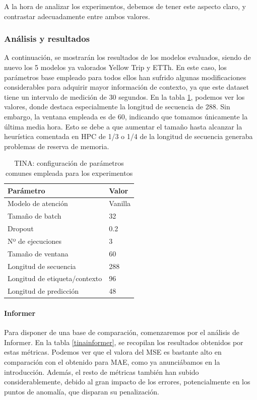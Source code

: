 A la hora de analizar los experimentos, debemos de tener este aspecto claro, y contrastar adecuadamente entre ambos valores.

\subsubsection{Análisis y resultados}

A continuación, se mostrarán los resultados de los modelos evaluados, siendo de nuevo los 5 modelos ya valorados Yellow Trip y ETTh. En este caso, los parámetros base empleado para todos ellos han sufrido algunas modificaciones considerables para adquirir mayor información de contexto, ya que este dataset tiene un intervalo de medición de 30 segundos. En la tabla \ref{ajustestina}, podemos ver los valores, donde destaca especialmente la longitud de secuencia de 288. Sin embargo, la ventana empleada es de 60, indicando que tomamos únicamente la última media hora. Esto se debe a que aumentar el tamaño hasta alcanzar la heurística comentada en HPC de 1/3 o 1/4 de la longitud de secuencia generaba problemas de reserva de memoria.

\begin{table}[!ht]
	\centering
	\begin{tabular}{l|l}
		\toprule
		Parámetro & Valor \\
		\midrule
		{Modelo de atención} & Vanilla \\
		{Tamaño de batch} & 32 \\
		{Dropout} & 0.2 \\
		{Nº de ejecuciones} & 3 \\
		{Tamaño de ventana} & 60 \\
		{Longitud de secuencia} & 288 \\
		{Longitud de etiqueta/contexto} & 96 \\
		{Longitud de predicción} & 48 \\
		\bottomrule
	\end{tabular}
	\caption{TINA: configuración de parámetros comunes empleada para los experimentos}
	\label{ajustestina}
\end{table}

\paragraph{Informer}

Para disponer de una base de comparación, comenzaremos por el análisis de Informer. En la tabla \ref{tinainformer}, se recopilan los resultados obtenidos por estas métricas. Podemos ver que el valora del MSE es bastante alto en comparación con el obtenido para MAE, como ya anunciábamos en la introducción. Además, el resto de métricas también han subido considerablemente, debido al gran impacto de los errores, potencialmente en los puntos de anomalía, que disparan su penalización.\\

